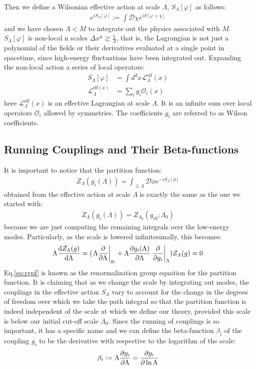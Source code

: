 Then we define a Wilsonian effective action at scale $\Lambda$, $S_{\Lambda}[\varphi]$ as follows:
\begin{align}
    e^{iS_{\Lambda}[\varphi]} := \int \mathcal{D}\chi e^{iS[\varphi + \chi]}
\end{align}
and we have chosen $\Lambda < M$ to integrate out the physics associated with $M$. $S_{\Lambda} [\varphi]$ is non-local n scales $\Delta x^{\mu} \gtrsim \frac{1}{\Lambda}$, that is, the Lagrangian is not just a polynomial of the fields or their derivatives evaluated at a single point in spacetime, since high-energy fluctuations have been integrated out. Expanding the non-local action a series of local operators:
\begin{align}
    S_{\Lambda} [\varphi] &= \int d^{d}x \mathcal{L}_{\Lambda}^{\text{eff}}(x) \\
    \mathcal{L}_{\Lambda}^{\text{eff}(x)} &= \sum_{i} g_{i}\mathcal{O}_{i}(x)
\end{align}
here $\mathcal{L}_{\Lambda}^{\text{eff}}(x)$ is an effective Lagrangian at scale $\Lambda$.  It is an infinite sum over local operators $\mathcal{O}_{i}$ allowed by symmetries. The coefficients $g_{i}$ are referred to as Wilson coefficients.
\subsection{Running Couplings and Their Beta-functions}
It is important to notice that the partition function:
\begin{align}
    Z_{\Lambda} (g_{i} (\Lambda)) = \int _{\le \Lambda} \mathcal{D} \phi e^{-iS_{\Lambda}[\phi]}
\end{align}
obtained from the effective action at scale $\Lambda$ is exactly the same as the one we started with:
\begin{align}
    Z_{\Lambda}(g_{i}(\Lambda)) = Z_{\Lambda_{0}}(g_{i0};\Lambda_{0})
\end{align}
because we are just computing the remaining integrals over the low-energy modes. Particularly, as the scale is lowered infinitesimally, this becomes:
\begin{align}
    \label{eq:rgpf}
    \Lambda\dv{Z_{\Lambda}(g)}{\Lambda} = (\eval{\Lambda \pdv{\Lambda}}_{g_{i}} + \Lambda\pdv{g_{i}(\Lambda)}{\Lambda} \eval{\pdv{g_{i}}}_{\Lambda})Z_{\Lambda}(g) = 0
\end{align}
Eq.\ref{eq:rgpf} is known as the renormalization group equation for the partition function. It is claiming that as we change the scale by integrating out modes, the couplings in the effective action $S_{\Lambda}$ vary to account for the change in the degrees of freedom over which we take the path integral so that the partition function is indeed independent of the scale at which we define our theory, provided this scale is below our initial cut-off scale $\Lambda_{0}$. Since the running of couplings is so important, it has a specific name and we can define the beta-function $\beta _{i}$ of the coupling $g_{i}$ to be the derivative with respective to the logarithm of the scale:
\begin{align}
    \beta_{i} := \Lambda\pdv{g_{i}}{\Lambda} = \pdv{g_{i}}{\ln \Lambda}
\end{align}


